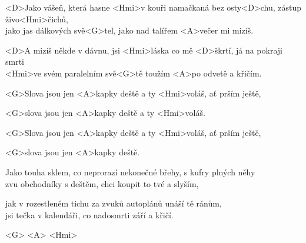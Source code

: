 
\zs
<D>Jako vášeň, která hasne <Hmi>v kouři
namačkaná bez osty<D>chu, zástup živo<Hmi>čichů, \\
jako jas dálkových svě<G>tel, jako nad talířem <A>večer
mi mizíš.

<D>A mizíš někde v dávnu,
jsi <Hmi>láska co mě <D>škrtí, já na pokraji smrti \\
<Hmi>ve svém paralelním svě<G>tě toužím <A>po odvetě
a křičím.
\ks
\zr

<G>Slova jsou jen <A>kapky deště a ty <Hmi>voláš, ať prším ještě,

<G>slova jsou jen <A>kapky deště a ty <Hmi>voláš.

<G>Slova jsou jen <A>kapky deště a ty <Hmi>voláš, ať prším 
ještě,

<G>slova jsou jen <A>kapky deště.

\kr
\zs

Jako touha sklem, co neprorazí
nekonečné břehy, s kufry plných něhy \\
zvu obchodníky s deštěm, chci koupit to tvé 
a slyším,

jak v rozestleném tichu
za zvuků autoplánů unáší tě ránům, \\
jsi tečka v kalendáři, co nadosmrti září
a křičí.

\ks
\zr
\kr
\zs

<G> <A> <Hmi> 
\ks
\zr
\kr
\kp


